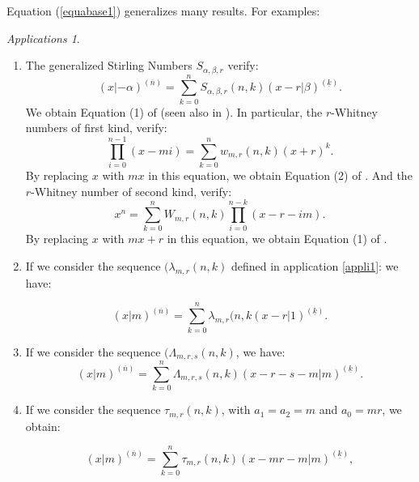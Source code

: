 \documentclass[12pt,a4paper]{article}
\theoremstyle{definition} %
\theoremstyle{remark}
\theoremstyle{examples}
\newtheorem{appli}[theorem]{Applications}
\newcommand{\suit}[1]{{#1}(n,k)}
\newcommand{\argtgen}[3]{(#1|#2)^{(\overline{#3})}}
\newcommand{\argtgenm}[3]{(#1|#2)^{(\underline{#3})}}
\begin{document}
\noindent
Equation (\ref{equabase1}) generalizes many results. For examples:
\begin{appli}\rm
	\begin{enumerate}	
		\item The generalized Stirling Numbers $S_{\alpha,\beta,r}$ verify: 
		\begin{equation}
		(x|-\alpha)^{(\overline{n})}=\sum_{k=0}^nS_{\alpha,\beta,r}(n,k)(x-r|\beta)^{(\underline{k})}.
		\end{equation} 
		We obtain Equation (1) of \cite{hsu1998unified} (seen also in \cite{Maier2023}).
		In particular, the $r$-Whitney numbers of first kind, verify:  \begin{equation}\label{equamezo1}\prod_{i=0}^{n-1}(x-mi)=\sum_{k=0}^nw_{m,r}(n,k)(x+r)^k.\end{equation}
		By replacing $x$ with $mx$ in this equation, we obtain Equation (2) of \cite{Mezo2010Bernoulli}.		
		And the $r$-Whitney number of second kind, verify: \begin{equation}\label{equamezo2}x^n=\sum_{k=0}^nW_{m,r}(n,k)\prod_{i=0}^{n-k}(x-r-im).\end{equation}
		By replacing $x$ with $mx+r$ in this equation, we obtain Equation (1) of \cite{Mezo2010Bernoulli}.
		
		
		\item If we consider the sequence $(\lambda_{m,r}(n,k)$ defined in application \ref{appli1}:
		we have:
		
		\begin{equation}\label{equabase2}
		\argtgen{x}{m}{n}=  \sum_{k=0}^n \lambda_{m,r}(n,k \argtgenm{x-r}{1}{k}.
		\end{equation}
		
		\item	 If we consider the sequence $(\Lambda_{m,r,s}(n,k)$,
		we have: \begin{equation}
		(x|m)^{(\overline{n})}=\sum_{k=0}^n\Lambda_{m,r,s}(n,k)(x-r-s-m|m)^{(\underline{k})}.
		\end{equation} 
		
		\item If we consider the sequence $\tau_{m,r}(n,k)$, with $a_1=a_2=m$ and $a_0=mr$, we obtain: 
		
		\begin{equation}\label{equabase3}
		\argtgen{x}{m}{n}= \sum_{k=0}^n \suit{\tau_{m,r}} \argtgenm{x-mr-m}{m}{k},
		\end{equation}
	\end{enumerate}
	
\end{appli}
\end{document}
